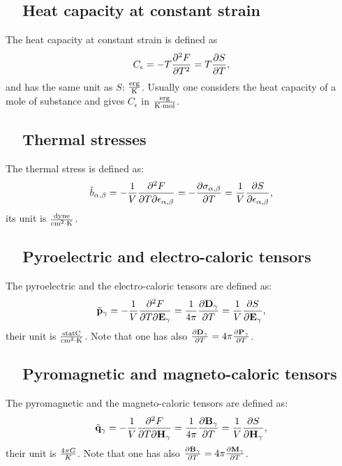 \documentclass[12pt,a4paper,twoside]{report}
\begin{document}
{\subsection{\color{orange}\ \ Heat capacity at constant strain}
The heat capacity at constant strain is defined as
\begin{equation}
C_\epsilon= - T {\partial^2 F \over \partial T^2} = 
T {\partial S \over \partial T},
\end{equation}
and has the same unit as $S$: ${\rm erg}\over {\rm K}$. Usually one 
considers the heat
capacity of a mole of substance and gives $C_\epsilon$ in 
${{\rm erg}\over {\rm K} \cdot {\rm mol}}$.

\subsection{\color{orange}\ \ Thermal stresses}
The thermal stress is defined as:
\begin{equation}
\tilde b_{\alpha,\beta} = 
-{1\over V} {\partial^2 F \over \partial T
\partial \epsilon_{\alpha,\beta}}=
-{\partial \sigma_{\alpha,\beta} \over \partial T}=
{1\over V} {\partial S \over \partial {\bf \epsilon}_{\alpha,\beta}},
\end{equation}
its unit is ${{\rm dyne} \over {\rm cm}^2 \cdot {\rm K}}$.

\subsection{\color{orange}\ \ Pyroelectric and electro-caloric tensors}
The pyroelectric and the electro-caloric tensors are defined as:
\begin{equation}
\tilde {\bf p}_\gamma =
-{1\over V} {\partial^2 F \over \partial T
\partial {\bf E}_\gamma}=
{1\over 4 \pi} {\partial {\bf D}_\gamma \over \partial T}=
{1\over V} {\partial S \over \partial {\bf E}_{\gamma}},
\end{equation}
their unit is ${{\rm statC} \over {\rm cm}^2 \cdot {\rm K}}$. Note that one has also
${\partial {\bf D}_\gamma \over \partial T}=4 \pi
{\partial {\bf P}_\gamma \over \partial T}$. 

\subsection{\color{orange}\ \ Pyromagnetic and magneto-caloric tensors}
The pyromagnetic and the magneto-caloric tensors are defined as:
\begin{equation}
\tilde {\bf q}_\gamma = 
-{1\over V} {\partial^2 F \over \partial T
\partial {\bf H}_\gamma}=
{1 \over 4 \pi} {\partial {\bf B}_\gamma \over \partial T}=
{1\over V} {\partial S \over \partial {\bf H}_{\gamma}},
\end{equation}
their unit is ${4 \pi G \over K}$. Note that one has also
${\partial {\bf B}_\gamma \over \partial T}= 4 \pi
{\partial {\bf M}_\gamma \over \partial T}$.

}
\end{document}
